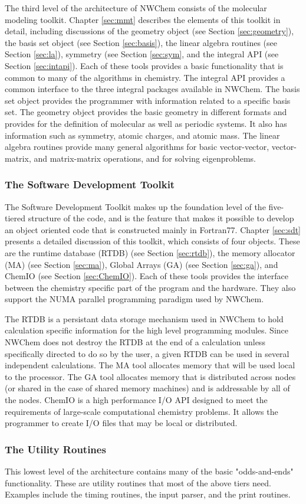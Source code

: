 The third level of the architecture of NWChem consists of
the molecular modeling toolkit.  Chapter \ref{sec:mmt} describes the
elements of this toolkit in detail,  including discussions of 
the geometry object (see Section \ref{sec:geometry}), 
the basis set object (see Section \ref{sec:basis}), the
linear algebra routines (see Section \ref{sec:la}), 
symmetry (see Section \ref{sec:sym}, and
the integral API (see Section
\ref{sec:intapi}).  Each of these 
tools provides a basic functionality that is common to many of the
algorithms in chemistry.  The integral API provides a common interface to
the three integral packages available in NWChem.  The basis set object
provides the programmer with information related to a specific basis
set.  The geometry object provides the basic geometry in different
formats and provides for the definition of molecular as well as periodic
systems.  It also has information such as symmetry, atomic charges, and
atomic mass.  The linear algebra routines provide many general 
algorithms for basic vector-vector, vector-matrix, and matrix-matrix
operations, and for solving
eigenproblems.

\subsubsection{The Software Development Toolkit}

The Software Development Toolkit
makes up the foundation level of the five-tiered
structure of the code, and is the feature that makes it possible
to develop an object oriented code that is constructed mainly
in Fortran77.  Chapter \ref{sec:sdt} presents a detailed discussion
of this toolkit, which consists of four objects.
These are the runtime database (RTDB) (see Section
\ref{sec:rtdb}), the memory allocator (MA) (see Section \ref{sec:ma}),
Global Arrays (GA) (see Section \ref{sec:ga}), and ChemIO 
(see Section \ref{sec:ChemIO}).  Each of these tools provides the
interface between the chemistry specific part of the program and the
hardware.  They also support the NUMA parallel programming
paradigm used by NWChem.

The RTDB is a persistant data storage mechanism used in NWChem
to hold calculation specific information for the high level
programming modules.  Since NWChem does not destroy the RTDB at the end of
a calculation unless specifically directed to do so by the user, 
a given RTDB can be used in several independent
calculations.  The MA tool allocates memory that will be used local to
the processor.  The GA tool allocates memory that is distributed across
nodes (or shared in the case of shared memory machines) and is addressable
by all of the nodes.  ChemIO is a high performance I/O API 
designed to meet the requirements of large-scale computational
chemistry problems.  It allows the programmer to 
create I/O files that may be local or distributed.

\subsubsection{The Utility Routines}

This lowest level of the architecture contains many of the basic 
"odds-and-ends" functionality.
These are utility routines that most of the
above tiers need.
Examples include the timing routines,
the input parser, 
and the print routines.

